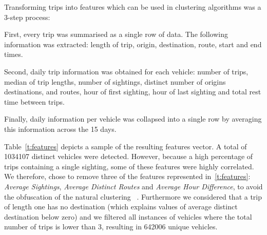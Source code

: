 Transforming trips into features which can be used in clustering algorithms was a 3-step process:
\begin{enumerate*}[label=(\roman*)]
  \item First, every trip was summarised as a single row of data. The following information was extracted: length of trip, origin, destination, route, start and end times.
  \item Second, daily trip information was obtained for each vehicle: number of trips, median of trip lengths, number of sightings, distinct number of origins destinations, and routes, hour of first sighting, hour of last sighting and total rest time between trips.
  \item Finally, daily information per vehicle was collapsed into a single row by averaging this information across the 15 days.
\end{enumerate*}

Table~\ref{t:features} depicts a sample of the resulting features vector. A total of 1034107 distinct vehicles were detected. However, because a high percentage of trips containing a single sighting, some of these features were highly correlated. We therefore, chose to remove three of the features represented in~\ref{t:features}: \emph{Average Sightings}, \emph{Average Distinct Routes} and \emph{Average Hour Difference}, to avoid the obfuscation of the natural clustering ~\cite{Kmeans}. Furthermore we considered that a trip of length one has no destination (which explains values of average distinct destination below zero) and we filtered all instances of vehicles where the total number of trips is lower than 3, resulting in 642006 unique vehicles.

